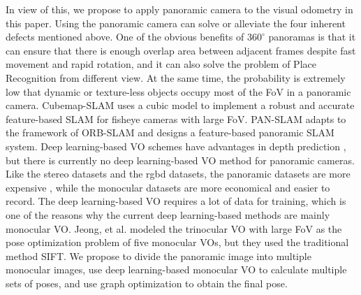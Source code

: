 In view of this, we propose to apply panoramic camera to the visual odometry in this paper.
Using the panoramic camera can solve or alleviate the four inherent defects mentioned above.
One of the obvious benefits of $360^{\circ}$ panoramas is that it can ensure that there is enough overlap area between adjacent frames despite fast movement and rapid rotation, and it can also solve the problem of Place Recognition from different view.
At the same time, the probability is extremely low that dynamic or texture-less objects occupy most of the FoV in a panoramic camera.
Cubemap-SLAM \cite{wang2018cubemapslam} uses a cubic model to implement a robust and accurate feature-based SLAM for fisheye cameras with large FoV.
PAN-SLAM \cite{ji2020panoramic} adapts to the framework of ORB-SLAM and designs a feature-based panoramic SLAM system.
Deep learning-based VO schemes have advantages in depth prediction \cite{zhou2017unsupervised,bian2019unsupervised}, but there is currently no deep learning-based VO method for panoramic cameras.
Like the stereo datasets and the rgbd datasets, the panoramic datasets are more expensive \cite{chen2019palvo}, while the monocular datasets are more economical and easier to record.
The deep learning-based VO requires a lot of data for training, which is one of the reasons why the current deep learning-based methods are mainly monocular VO.
Jeong, et al. \cite{jeong2013trinocular} modeled the trinocular VO with large FoV as the pose optimization problem of five monocular VOs, but they used the traditional method SIFT.
We propose to divide the panoramic image into multiple monocular images, use deep learning-based monocular VO to calculate multiple sets of poses, and use graph optimization to obtain the final pose.
